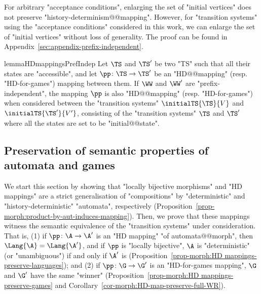 \documentclass[10pt,a4paper]{amsart}
\begin{document}
For arbitrary "acceptance conditions", enlarging the set of "initial vertices" does not preserve "history-determinism@@mapping". However, for "transition systems" using the "acceptance conditions" considered in this work, we can enlarge the set of "initial vertices" without loss of generality. The proof can be found in Appendix~\ref{sec:appendix-prefix-independent}.


\begin{restatable}{lemma}{HDmappingsPrefIndep}\label{lemma-morph:HD mappings-with-prefix-independent-conditions}
	Let $\TS$ and $\TS'$ be two "TS" such that all their states are "accessible", and let $\pp\colon \TS \to \TS'$ be an "HD@@mapping" (resp. "HD-for-games") mapping between them. If $\WW$ and $\WW'$ are "prefix-independent", the mapping $\pp$ is also "HD@@mapping" (resp. "HD-for-games") when considered between the "transition systems" $\initialTS{\TS}{V}$ and $\initialTS{\TS'}{V'}$, consisting of the "transition systems" $\TS$ and $\TS'$ where all the states are set to be "initial@@state".
\end{restatable}


\subsection{Preservation of semantic properties of automata and games}\label{subsec-morph:semantic-properties}

We start this section by showing that "locally bijective morphisms" and "HD mappings" are a strict generalisation of "compositions" by "deterministic" and "history-deterministic" "automata", respectively (Proposition~\ref{prop-morph:product-by-aut-induces-mapping}). 
Then, we prove that these mappings witness the semantic equivalence of the "transition systems" under consideration. That is, (1) if $\pp\colon \A\to \A'$ is an "HD mapping" "of automata@@morph", then $\Lang{\A} = \Lang{\A'}$, and if $\pp$ is "locally bijective", $\A$ is "deterministic" (or "unambiguous") if and only if $\A'$ is (Proposition~\ref{prop-morph:HD mappings-preserve-languages});\footnotemark{} and (2) if $\pp\colon \G\to \G'$ is an "HD-for-games mapping", $\G$ and $\G'$ have the same "winner" (Proposition~\ref{prop-morph:HD mappings-preserve-games} and Corollary~\ref{cor-morph:HD-map-preserve-full-WR}).

\end{document}
